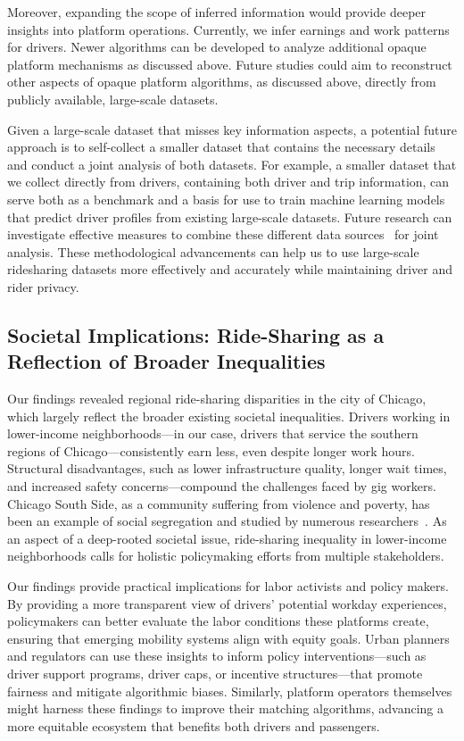 Moreover, expanding the scope of inferred information would provide deeper insights into platform operations. Currently, we infer earnings and work patterns for drivers. Newer algorithms can be developed to analyze additional opaque platform mechanisms as discussed above. Future studies could aim to reconstruct other aspects of opaque platform algorithms, as discussed above, directly from publicly available, large-scale datasets.

Given a large-scale dataset that misses key information aspects, a potential future approach is to self-collect a smaller dataset that contains the necessary details and conduct a joint analysis of both datasets. For example, a smaller dataset that we collect directly from drivers, containing both driver and trip information, can serve both as a benchmark and a basis for use to train machine learning models that predict driver profiles from existing large-scale datasets. Future research can investigate effective measures to combine these different data sources~\cite{harris2018federal} for joint analysis. These methodological advancements can help us to use large-scale ridesharing datasets more effectively and accurately while maintaining driver and rider privacy.


\subsection{Societal Implications: Ride-Sharing as a Reflection of Broader Inequalities}

Our findings revealed regional ride-sharing disparities in the city of Chicago, which largely reflect the broader existing societal inequalities. Drivers working in lower-income neighborhoods---in our case, drivers that service the southern regions of Chicago---consistently earn less, even despite longer work hours. Structural disadvantages, such as lower infrastructure quality, longer wait times, and increased safety concerns---compound the challenges faced by gig workers. Chicago South Side, as a community suffering from violence and poverty, has been an example of social segregation and studied by numerous researchers~\cite{moore2016south, bachin2004building, bell1993community}. As an aspect of a deep-rooted societal issue, ride-sharing inequality in lower-income neighborhoods calls for holistic policymaking efforts from multiple stakeholders.

Our findings provide practical implications for labor activists and policy makers. By providing a more transparent view of drivers’ potential workday experiences, policymakers can better evaluate the labor conditions these platforms create, ensuring that emerging mobility systems align with equity goals. Urban planners and regulators can use these insights to inform policy interventions---such as driver support programs, driver caps, or incentive structures---that promote fairness and mitigate algorithmic biases. Similarly, platform operators themselves might harness these findings to improve their matching algorithms, advancing a more equitable ecosystem that benefits both drivers and passengers.

